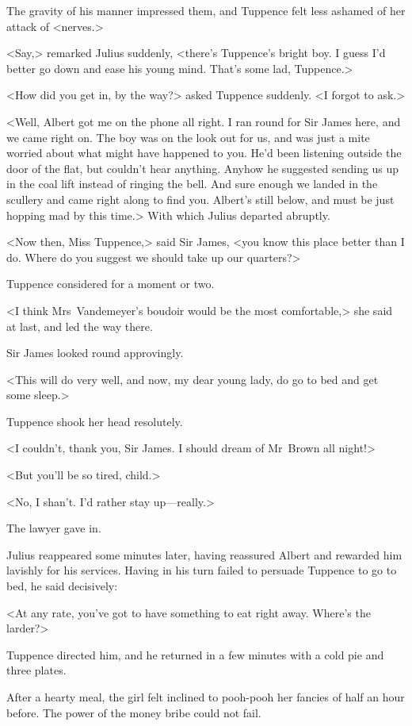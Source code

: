 The gravity of his manner impressed them, and Tuppence felt less ashamed of her attack of <nerves.>

<Say,> remarked Julius suddenly, <there's Tuppence's bright boy. I guess I'd better go down and ease his young mind. That's some lad, Tuppence.>

<How did you get in, by the way?> asked Tuppence suddenly. <I forgot to ask.>

<Well, Albert got me on the phone all right. I ran round for Sir James here, and we came right on. The boy was on the look out for us, and was just a mite worried about what might have happened to you. He'd been listening outside the door of the flat, but couldn't hear anything. Anyhow he suggested sending us up in the coal lift instead of ringing the bell. And sure enough we landed in the scullery and came right along to find you. Albert's still below, and must be just hopping mad by this time.> With which Julius departed abruptly.

<Now then, Miss Tuppence,> said Sir James, <you know this place better than I do. Where do you suggest we should take up our quarters?>

Tuppence considered for a moment or two.

<I think Mrs~Vandemeyer's boudoir would be the most comfortable,> she said at last, and led the way there.

Sir James looked round approvingly.

<This will do very well, and now, my dear young lady, do go to bed and get some sleep.>

Tuppence shook her head resolutely.

<I couldn't, thank you, Sir James. I should dream of Mr~Brown all night!>

<But you'll be so tired, child.>

<No, I shan't. I'd rather stay up—really.>

The lawyer gave in.

Julius reappeared some minutes later, having reassured Albert and rewarded him lavishly for his services. Having in his turn failed to persuade Tuppence to go to bed, he said decisively:

<At any rate, you've got to have something to eat right away. Where's the larder?>

Tuppence directed him, and he returned in a few minutes with a cold pie and three plates.

After a hearty meal, the girl felt inclined to pooh-pooh her fancies of half an hour before. The power of the money bribe could not fail.

